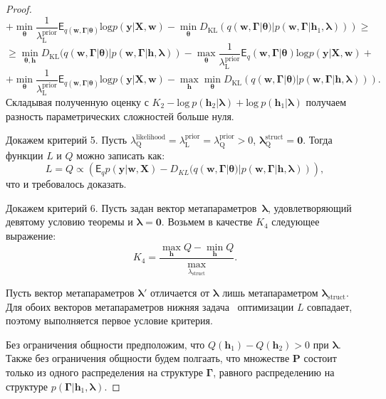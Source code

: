 \begin{proof}
\[\]
\[
+ \min_{\boldsymbol{\theta}} \frac{1}{\lambda^\text{prior}_\text{L}}\mathsf{E}_{q(\mathbf{w}, \boldsymbol{\Gamma}|\boldsymbol{\theta})} \text{log} p(\mathbf{y}|\mathbf{X}, \mathbf{w}) 
- \min_{\boldsymbol{\theta}} D_\text{KL}(q(\mathbf{w}, \boldsymbol{\Gamma}|\boldsymbol{\theta})|p(\mathbf{w}, \boldsymbol{\Gamma}|\mathbf{h}_1, \boldsymbol{\lambda}))) 
 \geq
\]
\[
 \geq
\min_{\boldsymbol{\theta}, \mathbf{h}} D_\text{KL}(q(\mathbf{w}, \boldsymbol{\Gamma}|\boldsymbol{\theta})|p(\mathbf{w}, \boldsymbol{\Gamma}|\mathbf{h}, \boldsymbol{\lambda})) - \max_{\boldsymbol{\theta}}\frac{1}{\lambda^\text{prior}_\text{L}}\mathsf{E}_q(\mathbf{w}, \boldsymbol{\Gamma}|\boldsymbol{\theta}) \text{log} p(\mathbf{y}|\mathbf{X}, \mathbf{w}) +
\]
\[ + \min_{\boldsymbol{\theta}} \frac{1}{\lambda^\text{prior}_\text{L}}\mathsf{E}_{q(\mathbf{w}, \boldsymbol{\Gamma}|\boldsymbol{\theta})} \text{log} p(\mathbf{y}|\mathbf{X}, \mathbf{w}) 
- \max_{\mathbf{h}}\min_{\boldsymbol{\theta}} D_\text{KL}(q(\mathbf{w}, \boldsymbol{\Gamma}|\boldsymbol{\theta})|p(\mathbf{w}, \boldsymbol{\Gamma}|\mathbf{h}, \boldsymbol{\lambda}))). 
\]
Складывая полученную оценку с $K_2 -\text{log}~p (\mathbf{h}_2|\boldsymbol{\lambda})+\text{log}~p (\mathbf{h}_1|\boldsymbol{\lambda})$ получаем разность параметрических сложностей больше нуля.

Докажем критерий 5. Пусть $\lambda^\text{likelihood}_\text{Q} = \lambda^\text{prior}_\text{L} = \lambda^\text{prior}_\text{Q} > 0$, $\boldsymbol{\lambda}^\text{struct}_\text{Q} = \mathbf{0}$. Тогда функции $L$ и $Q$  можно записать как: $$L = Q \propto \left(\mathsf{E}_q p(\mathbf{y}|\mathbf{w}, \mathbf{X})-{D}_{KL}(q(\mathbf{w}, \boldsymbol{\Gamma}|\boldsymbol{\theta})|p(\mathbf{w}, \boldsymbol{\Gamma}|\mathbf{h}, \boldsymbol{\lambda}))\right),$$ что и требовалось доказать.

Докажем критерий 6. 
Пусть задан вектор метапараметров~$\boldsymbol{\lambda}$, удовлетворяющий девятому условию теоремы и $\boldsymbol{\lambda} = \mathbf{0}$. 
Возьмем в качестве $K_4$ следующее выражение:
\[
K_4 = \frac{\max_{\mathbf{h}} Q - \min_{\mathbf{h}} Q }{\max_{\lambda_\text{struct}}}.
\]



Пусть вектор метапараметров $\boldsymbol{\lambda}'$ отличается от $\boldsymbol{\lambda}$ лишь метапараметром $\boldsymbol{\lambda}_\text{struct}$. Для  обоих векторов метапараметров нижняя задача  оптимизации $L$ совпадает, поэтому выполняется первое условие критерия.

Без ограничения общности предположим, что $Q(\mathbf{h}_1)-Q(\mathbf{h}_2) > 0$ при $\boldsymbol{\lambda}.$ Также без ограничения общности будем полгаать, что множестве $\mathbf{P}$ состоит только из одного распределения на структуре $\boldsymbol{\Gamma}$, равного распределению на структуре $p(\boldsymbol{\Gamma}|\mathbf{h}_1, \boldsymbol{\lambda}).$


\end{proof}
